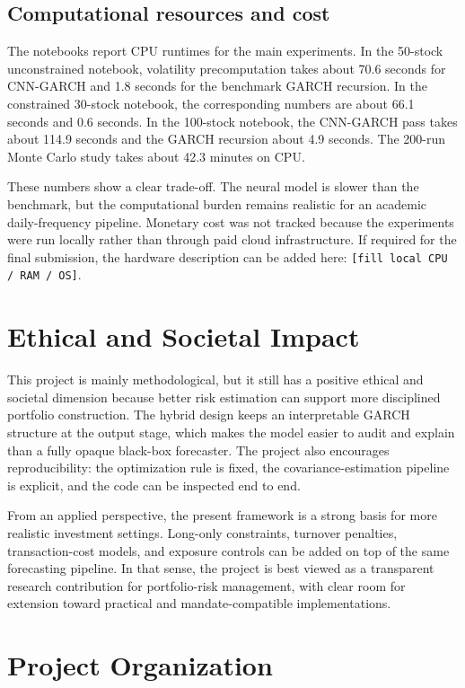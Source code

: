 \documentclass[11pt,a4paper]{article}
\begin{document}
\subsection{Computational resources and cost}

The notebooks report CPU runtimes for the main experiments. In the 50-stock unconstrained notebook, volatility precomputation takes about 70.6 seconds for CNN-GARCH and 1.8 seconds for the benchmark GARCH recursion. In the constrained 30-stock notebook, the corresponding numbers are about 66.1 seconds and 0.6 seconds. In the 100-stock notebook, the CNN-GARCH pass takes about 114.9 seconds and the GARCH recursion about 4.9 seconds. The 200-run Monte Carlo study takes about 42.3 minutes on CPU.

These numbers show a clear trade-off. The neural model is slower than the benchmark, but the computational burden remains realistic for an academic daily-frequency pipeline. Monetary cost was not tracked because the experiments were run locally rather than through paid cloud infrastructure. If required for the final submission, the hardware description can be added here: \texttt{[fill local CPU / RAM / OS]}.

\section{Ethical and Societal Impact}

This project is mainly methodological, but it still has a positive ethical and societal dimension because better risk estimation can support more disciplined portfolio construction. The hybrid design keeps an interpretable GARCH structure at the output stage, which makes the model easier to audit and explain than a fully opaque black-box forecaster. The project also encourages reproducibility: the optimization rule is fixed, the covariance-estimation pipeline is explicit, and the code can be inspected end to end.

From an applied perspective, the present framework is a strong basis for more realistic investment settings. Long-only constraints, turnover penalties, transaction-cost models, and exposure controls can be added on top of the same forecasting pipeline. In that sense, the project is best viewed as a transparent research contribution for portfolio-risk management, with clear room for extension toward practical and mandate-compatible implementations.

\section{Project Organization}
\end{document}
